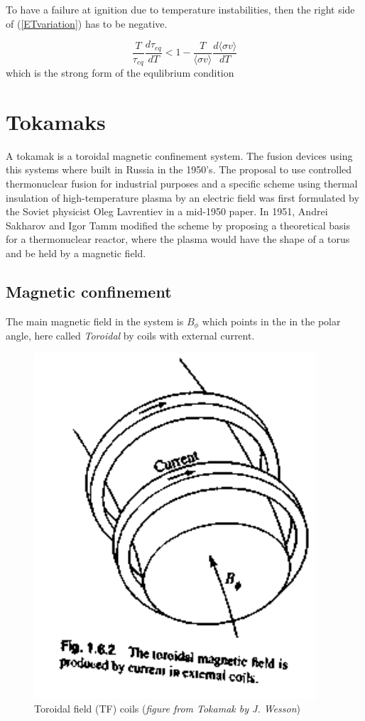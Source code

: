 \documentclass[smallextended]{svjour3}
\begin{document}
To have a failure at ignition due to temperature instabilities, then the right side of (\ref{ETvariation}) has to be negative.

\begin{equation}
 \frac{T}{\tau_{eq}} \frac{d\tau_{eq}}{dT}   < 1 - \frac{T}{\langle \sigma v \rangle} \frac{d\langle \sigma v \rangle}{dT}
\end{equation}
which is the strong form of the equlibrium condition
\section{Tokamaks}

A tokamak is a toroidal magnetic confinement system. The fusion devices using this systems where built in Russia in the 1950's. The proposal to use controlled thermonuclear fusion for industrial purposes and a specific scheme using thermal insulation of high-temperature plasma by an electric field was first formulated by the Soviet physicist Oleg Lavrentiev in a mid-1950 paper. In 1951, Andrei Sakharov and Igor Tamm modified the scheme by proposing a theoretical basis for a thermonuclear reactor, where the plasma would have the shape of a torus and be held by a magnetic field.

\subsection{Magnetic confinement}

The main magnetic field in the system is $B_{\phi}$ which points in the in the polar angle, here called \textit{Toroidal} by coils with external current.

\begin{figure}[H]
    \centering
    \includegraphics[width=0.5\linewidth]{images/ToroidalMagneticFieldCoils.png}
    \caption{Toroidal field (TF) coils (\textit{figure from Tokamak by J. Wesson})}
    \label{fig:enter-label}
\end{figure}
\end{document}
